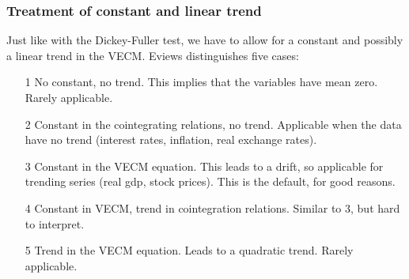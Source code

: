 \begin{frame}%

\frametitle{Treatment of constant and linear trend}

Just like with the Dickey-Fuller test, we have to allow for a constant and
possibly a linear trend in the VECM. Eviews distinguishes five cases:

\begin{itemize}
\item[1] No constant, no trend. This implies that the variables have mean zero. Rarely applicable.

\item[2] Constant in the cointegrating relations, no trend. Applicable when the data have no trend (interest rates, inflation, real
exchange rates).

\item[3] Constant in the VECM equation. This leads to a drift, so applicable for trending series (real gdp, stock prices). This is the default, for good reasons.
\item[4] Constant in VECM, trend in cointegration relations. Similar to 3, but hard to interpret.

\item[5] Trend in the VECM equation. Leads to a quadratic trend. Rarely applicable.
\end{itemize}

\end{frame}%

